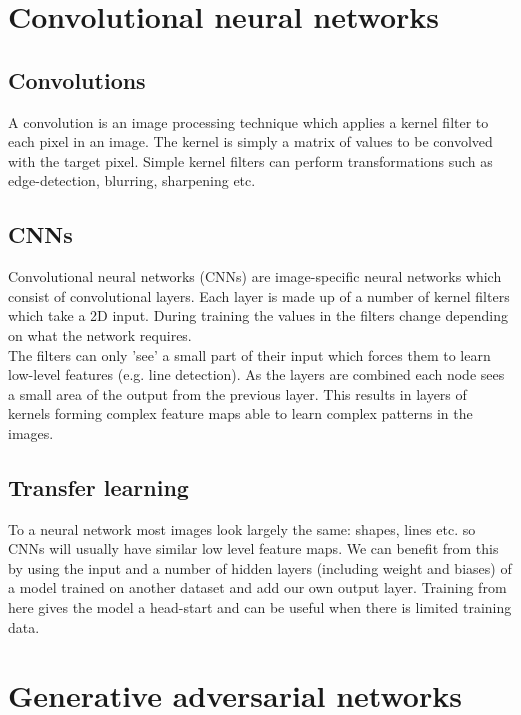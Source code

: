 \documentclass[
    author={Kai Hulme},
    supervisor={Dr Jon Bird},
    degree={BSc},
    title={Generative Adversarial Networks as an Augmentation Technique},
    subtitle={for Alzheimer's Disease Detection in MRI Volumes},
    type={Research},
    year={2021} 
]{dissertation}
\begin{document}

\section{Convolutional neural networks}

\subsection{Convolutions}

A convolution is an image processing technique which applies a kernel filter to each pixel in an image. The kernel is simply a matrix of values to be convolved with the target pixel. Simple kernel filters can perform transformations such as edge-detection, blurring, sharpening etc.

\subsection{CNNs}

Convolutional neural networks (CNNs) are image-specific neural networks which consist of convolutional layers. Each layer is made up of a number of kernel filters which take a 2D input. During training the values in the filters change depending on what the network requires. \\

The filters can only 'see' a small part of their input which forces them to learn low-level features (e.g. line detection). As the layers are combined each node sees a small area of the output from the previous layer. This results in layers of kernels forming complex feature maps able to learn complex patterns in the images.

\subsection{Transfer learning}
\label{transfer_learning}

To a neural network most images look largely the same: shapes, lines etc. so CNNs will usually have similar low level feature maps. We can benefit from this by using the input and a number of hidden layers (including weight and biases) of a model trained on another dataset and add our own output layer. Training from here gives the model a head-start and can be useful when there is limited training data.
	
	
\section{Generative adversarial networks}
\end{document}
